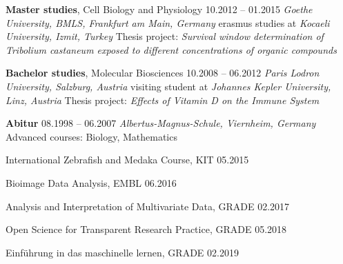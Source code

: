 \documentclass[11pt,singlespacinge,twoside]{reedthesis} %
\begin{document}
\noindent \textbf{Master studies}, Cell Biology and Physiology \hfill 10.2012 -- 01.2015\newline
\emph{Goethe University, BMLS, Frankfurt am Main, Germany}\newline
erasmus studies at \emph{Kocaeli University, Izmit, Turkey}\newline
Thesis project: \emph{Survival window determination of Tribolium castaneum \newline exposed to different concentrations of organic compounds}

\vspace{0.3cm}

\noindent \textbf{Bachelor studies}, Molecular Biosciences \hfill 10.2008 -- 06.2012\newline
\emph{Paris Lodron University, Salzburg, Austria}\newline
visiting student at \emph{Johannes Kepler University, Linz, Austria}\newline
Thesis project: \emph{Effects of Vitamin D on the Immune System}

\vspace{0.3cm}

\noindent \textbf{Abitur} \hfill 08.1998 -- 06.2007\newline
\emph{Albertus-Magnus-Schule, Viernheim, Germany}\newline
Advanced courses: Biology, Mathematics

\vspace{0.3cm}

 \hrulefill
\vspace{0.2cm}

\noindent International Zebrafish and Medaka Course, KIT \hfill 05.2015

\noindent Bioimage Data Analysis, EMBL \hfill 06.2016

\noindent Analysis and Interpretation of Multivariate Data, GRADE \hfill 02.2017

\noindent Open Science for Transparent Research Practice, GRADE \hfill 05.2018

\noindent Einführung in das maschinelle lernen, GRADE \hfill 02.2019

\vspace{0.3cm}
\end{document}
